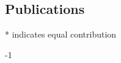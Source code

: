 \documentclass[margin,line,letterpaper]{resume}
\begin{document}
\begin{resume}







    \renewcommand*{\thefootnote}{\fnsymbol{footnote}}
    \section{\mysidestyle Publications}

\newcommand\blfootnote[1]{%
  \begingroup
  \renewcommand\thefootnote{}\footnote{#1}%
  \addtocounter{footnote}{-1}%
  \endgroup
}
    
\def\FormatName#1{%
  \def\myname{Siavash Mirarab}
  \def\mynamee{Siavash Mirarab*}%
  \edef\name{#1}%
  \ifx\name\myname
   \underline{#1}%
  \else
    \ifx\name\mynamee
       \underline{Siavash Mirarab}*
    \else
      #1%
    \fi
  \fi
}

\begin{footnotesize}
* indicates equal contribution
	\vspace{-20pt}
	\begin{spacing}{-1}
	
	\end{spacing}
\end{footnotesize}






\end{resume}
\end{document}
